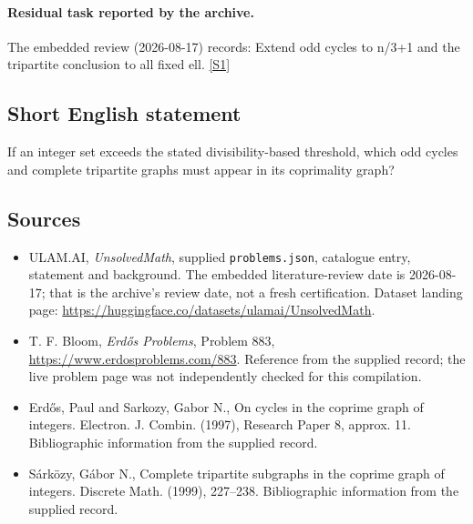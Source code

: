 \documentclass[11pt,a4paper]{article}
\newcommand{\sref}[2]{\hyperlink{source:#1:#2}{[S#2]}}
\begin{document}
\paragraph{Residual task reported by the archive.}

The embedded review (2026-08-17) records: Extend odd cycles to n/3+1 and the tripartite conclusion to all fixed ell. \sref{statement}{1}

\subsection{Short English statement}

If an integer set exceeds the stated divisibility-based threshold, which odd cycles and complete tripartite graphs must appear in its coprimality graph?

\subsection{Sources}

{\small

\begin{itemize}

\item[\hypertarget{source:statement:1}{S1}] ULAM.AI, \emph{UnsolvedMath}, supplied \texttt{problems.json}, catalogue entry, statement and background. The embedded literature-review date is 2026-08-17; that is the archive’s review date, not a fresh certification. Dataset landing page: \url{https://huggingface.co/datasets/ulamai/UnsolvedMath}.

\item[\hypertarget{source:statement:2}{S2}] T. F. Bloom, \emph{Erdős Problems}, Problem 883, \url{https://www.erdosproblems.com/883}. Reference from the supplied record; the live problem page was not independently checked for this compilation.

\item[\hypertarget{source:statement:3}{S3}] Erd\H{o}s, Paul and Sarkozy, Gabor N., On cycles in the coprime graph of integers. Electron. J. Combin. (1997), Research Paper 8, approx. 11. Bibliographic information from the supplied record.

\item[\hypertarget{source:statement:4}{S4}] S\'ark\"{o}zy, G\'abor N., Complete tripartite subgraphs in the coprime graph of integers. Discrete Math. (1999), 227--238. Bibliographic information from the supplied record.

\end{itemize}

}

\label{end:statement}
\end{document}
